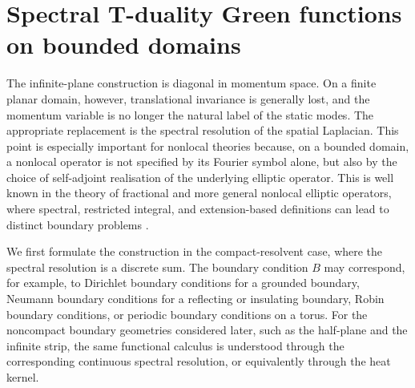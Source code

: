 \documentclass[openacc]{rsproca_new}%
\begin{document}
\section{Spectral T-duality Green functions on bounded domains}
\label{sec:spectral_bounded_domains}

The infinite-plane construction is diagonal in momentum space. On a finite planar domain, however, translational invariance is generally lost, and the momentum variable is no longer the natural label of the static modes. The appropriate replacement is the spectral resolution of the spatial Laplacian. This point is especially important for nonlocal theories because, on a bounded domain, a nonlocal operator is not specified by its Fourier symbol alone, but also by the choice of self-adjoint realisation of the underlying elliptic operator. This is well known in the theory of fractional and more general nonlocal elliptic operators, where spectral, restricted integral, and extension-based definitions can lead to distinct boundary problems \cite{Seeley1967, Grubb2015, Kwasnicki2017, BonitoPasciak2015}.

We first formulate the construction in the compact-resolvent case, where the spectral resolution is a discrete sum. The boundary condition $B$ may correspond, for example, to Dirichlet boundary conditions for a grounded boundary, Neumann boundary conditions for a reflecting or insulating boundary, Robin boundary conditions, or periodic boundary conditions on a torus. For the noncompact boundary geometries considered later, such as the half-plane and the infinite strip, the same functional calculus is understood through the corresponding continuous spectral resolution, or equivalently through the heat kernel.
\end{document}
